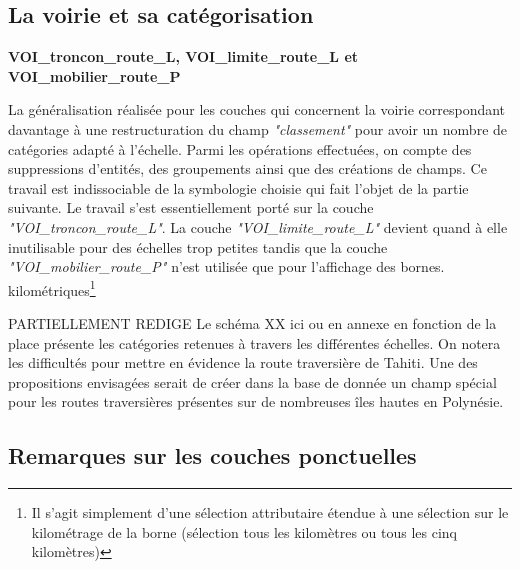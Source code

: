 \subsection{La voirie et sa catégorisation}
\begin{center}
    \footnotesize
    \textbf{VOI\_troncon\_route\_L, VOI\_limite\_route\_L et VOI\_mobilier\_route\_P }
\end{center}
La généralisation réalisée pour les couches qui concernent la voirie correspondant davantage à une restructuration du champ \textit{"classement" }pour avoir un nombre de catégories adapté à l'échelle. Parmi les opérations effectuées, on compte des suppressions d'entités, des groupements ainsi que des créations de champs. Ce travail est indissociable de la symbologie choisie qui fait l'objet de la partie suivante. Le travail s'est essentiellement porté sur la couche \textit{"VOI\_troncon\_route\_L"}. La couche \textit{"VOI\_limite\_route\_L"} devient quand à elle inutilisable pour des échelles trop petites tandis que la couche \textit{"VOI\_mobilier\_route\_P"} n'est utilisée que pour l'affichage des bornes. kilométriques\footnote{Il s'agit simplement d'une sélection attributaire étendue à une sélection sur le kilométrage de la borne (sélection tous les kilomètres ou tous les cinq kilomètres)}

{\color{magenta}PARTIELLEMENT REDIGE Le schéma XX ici ou en annexe en fonction de la place présente les catégories retenues à travers les différentes échelles.} On notera les difficultés pour mettre en évidence la route traversière de Tahiti. Une des propositions envisagées serait de créer dans la base de donnée un champ spécial pour les routes traversières présentes sur de nombreuses îles hautes en Polynésie.


\subsection{Remarques sur les couches ponctuelles}

